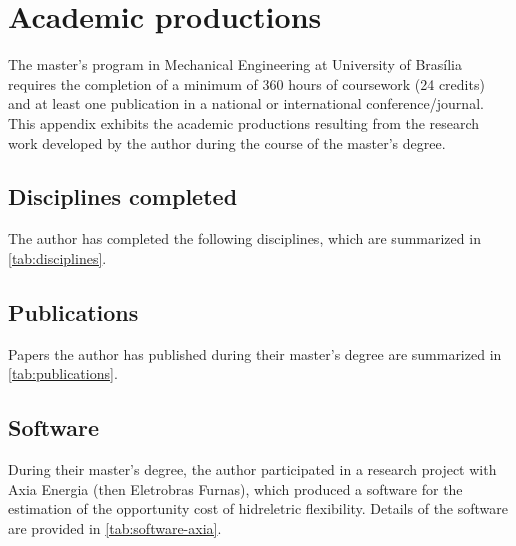 \chapter{Academic productions}
\label{chap:academic-productions}

The master's program in Mechanical Engineering at University of Brasília requires 
the completion of a minimum of 360 hours of coursework (24 credits)
and at least one publication in a national or international conference/journal.
%
This appendix exhibits the academic productions resulting from the research work 
developed by the author during the course of the master's degree.

\section{Disciplines completed}
\label{sec:disciplines-completed}
The author has completed the following disciplines,
which are summarized in \cref{tab:disciplines}.
%
\begin{table}[htbp]
    \centering
\end{table}

\section{Publications}
\label{sec:publications}

Papers the author has published during their master's degree are 
summarized in \cref{tab:publications}.
%
\begin{table}[htbp]
    \centering
\end{table}

\section{Software}
\label{sec:software}
During their master's degree, the author participated in a research project with Axia Energia (then Eletrobras Furnas), 
which produced a software for the estimation of the opportunity cost of hidreletric flexibility.
Details of the software are provided in \cref{tab:software-axia}.
%
\begin{table}[htbp]
    \centering
\end{table}